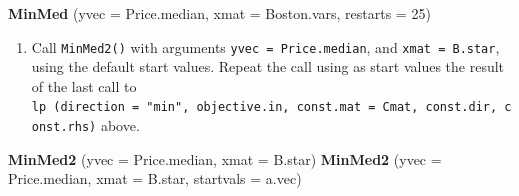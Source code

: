 \documentclass[
]{book}
\newenvironment{Shaded}{\begin{snugshade}}{\end{snugshade}}
\newcommand{\AttributeTok}[1]{\textcolor[rgb]{0.13,0.29,0.53}{#1}}
\newcommand{\DecValTok}[1]{\textcolor[rgb]{0.00,0.00,0.81}{#1}}
\newcommand{\FunctionTok}[1]{\textcolor[rgb]{0.13,0.29,0.53}{\textbf{#1}}}
\newcommand{\NormalTok}[1]{#1}
\providecommand{\tightlist}{%
  \setlength{\itemsep}{0pt}\setlength{\parskip}{0pt}}
\begin{document}
\begin{Shaded}
\begin{Highlighting}[]
\FunctionTok{MinMed}\NormalTok{ (}\AttributeTok{yvec =}\NormalTok{ Price.median, }\AttributeTok{xmat =}\NormalTok{ Boston.vars, }\AttributeTok{restarts =} \DecValTok{25}\NormalTok{)}
\end{Highlighting}
\end{Shaded}

\begin{enumerate}
\def\labelenumi{(\alph{enumi})}
\setcounter{enumi}{2}
\tightlist
\item
  Call \texttt{MinMed2()} with arguments \texttt{yvec\ =\ Price.median}, and \texttt{xmat\ =\ B.star}, using the default start values. Repeat the call using as start values the result of the last call to
  \texttt{lp\ (direction\ =\ "min",\ objective.in,\ const.mat\ =\ Cmat,\ const.dir,\ const.rhs)} above.
\end{enumerate}

\begin{Shaded}
\begin{Highlighting}[]
\FunctionTok{MinMed2}\NormalTok{ (}\AttributeTok{yvec =}\NormalTok{ Price.median, }\AttributeTok{xmat =}\NormalTok{ B.star)}
\FunctionTok{MinMed2}\NormalTok{ (}\AttributeTok{yvec =}\NormalTok{ Price.median, }\AttributeTok{xmat =}\NormalTok{ B.star, }\AttributeTok{startvals =}\NormalTok{ a.vec) }
\end{Highlighting}
\end{Shaded}



\end{document}
